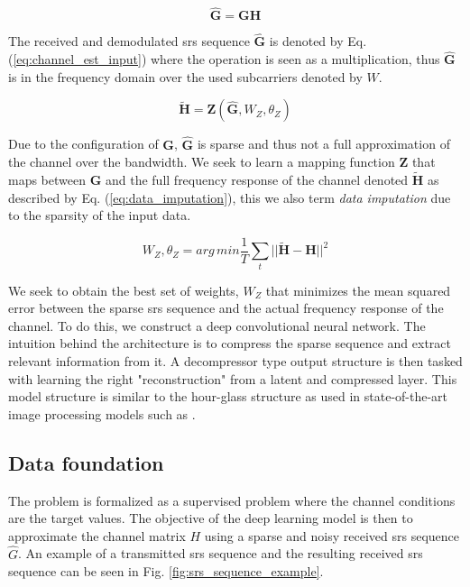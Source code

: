 \begin{equation}\label{eq:channel_est_input}
    \mathbf{\hat{G}} = \mathbf{G} \mathbf{H}
\end{equation}

The received and demodulated \gls{srs} sequence $\mathbf{\hat{G}}$ is denoted by Eq. (\ref{eq:channel_est_input}) where the operation is seen as a multiplication, thus $\mathbf{\hat{G}}$ is in the frequency domain over the used subcarriers denoted by $W$.

\begin{equation}\label{eq:data_imputation}
    \mathbf{\widetilde{H}} =   \mathbf{Z}(\mathbf{\hat{G}},W_Z, \theta_Z)
\end{equation}


Due to the configuration of $\mathbf{G}$, $\mathbf{\hat{G}}$ is sparse and thus not a full approximation of the channel over the bandwidth. We seek to learn a mapping function $\mathbf{Z}$ that maps between $\mathbf{\hat{G}}$ and the full frequency response of the channel denoted $\mathbf{\tilde{H}}$ as described by Eq. (\ref{eq:data_imputation}), this we also term \emph{data imputation} due to the sparsity of the input data.


\begin{equation}\label{eq:loss_function_channel_est}
    W_Z, \theta_Z = {arg\,min} \frac{1}{T}\sum_t || \mathbf{\widetilde{H}} - \mathbf{H}|| ^2
\end{equation}

We seek to obtain the best set of weights, $W_Z$ that minimizes the mean squared error between the sparse \gls{srs} sequence and the actual frequency response of the channel. To do this, we construct a deep convolutional neural network. The intuition behind the architecture is to compress the sparse sequence and extract relevant information from it. A decompressor type output structure is then tasked with learning the right "reconstruction" from a latent and compressed layer. This model structure is similar to the hour-glass structure as used in state-of-the-art image processing models such as \cite{DeepPrior}. 

\subsection{Data foundation}
The problem is formalized as a supervised problem where the channel conditions are the target values. The objective of the deep learning model is then to approximate the channel matrix $H$ using a sparse and noisy received \gls{srs} sequence $\hat{G}$. An example of a transmitted \gls{srs} sequence and the resulting received \gls{srs} sequence can be seen in Fig. \ref{fig:srs_sequence_example}. 

